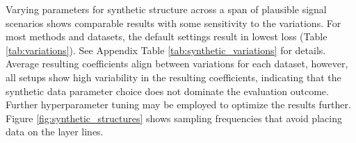 \documentclass[iucr,review]{iucrjournals}
\begin{document}
Varying parameters for synthetic structure across a span of plausible
signal scenarios shows comparable results with some sensitivity to the variations. For most methods and datasets,
the default settings
result in lowest loss (Table \ref{tab:variations}). See Appendix Table \ref{tab:synthetic_variations}
for details. Average resulting coefficients align between variations for each dataset, however, 
all setups show high variability in the resulting coefficients, indicating that the
synthetic data parameter choice does not dominate the evaluation outcome.
Further hyperparameter tuning may be employed to optimize the results further. 
Figure \ref{fig:synthetic_structures} shows sampling frequencies that avoid placing data on the layer lines.


\end{document}
